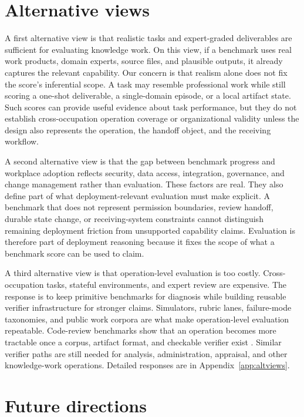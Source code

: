 \documentclass{article}
\begin{document}
\section{Alternative views}
\label{sec:altviews}
A first alternative view is that realistic tasks and expert-graded deliverables are sufficient for evaluating knowledge work.
On this view, if a benchmark uses real work products, domain experts, source files, and plausible outputs, it already captures the relevant capability.
Our concern is that realism alone does not fix the score's inferential scope.
A task may resemble professional work while still scoring a one-shot deliverable, a single-domain episode, or a local artifact state.
Such scores can provide useful evidence about task performance, but they do not establish cross-occupation operation coverage or organizational validity unless the design also represents the operation, the handoff object, and the receiving workflow.

A second alternative view is that the gap between benchmark progress and workplace adoption reflects security, data access, integration, governance, and change management rather than evaluation.
These factors are real.
They also define part of what deployment-relevant evaluation must make explicit.
A benchmark that does not represent permission boundaries, review handoff, durable state change, or receiving-system constraints cannot distinguish remaining deployment friction from unsupported capability claims.
Evaluation is therefore part of deployment reasoning because it fixes the scope of what a benchmark score can be used to claim.

A third alternative view is that operation-level evaluation is too costly.
Cross-occupation tasks, stateful environments, and expert review are expensive.
The response is to keep primitive benchmarks for diagnosis while building reusable verifier infrastructure for stronger claims.
Simulators, rubric lanes, failure-mode taxonomies, and public work corpora are what make operation-level evaluation repeatable.
Code-review benchmarks show that an operation becomes more tractable once a corpus, artifact format, and checkable verifier exist \citep{sweprbench2025,codefusecrbench2025,withmartiancr2024}.
Similar verifier paths are still needed for analysis, administration, appraisal, and other knowledge-work operations.
Detailed responses are in Appendix~\ref{app:altviews}.

\section{Future directions}
\label{sec:future}
\end{document}
